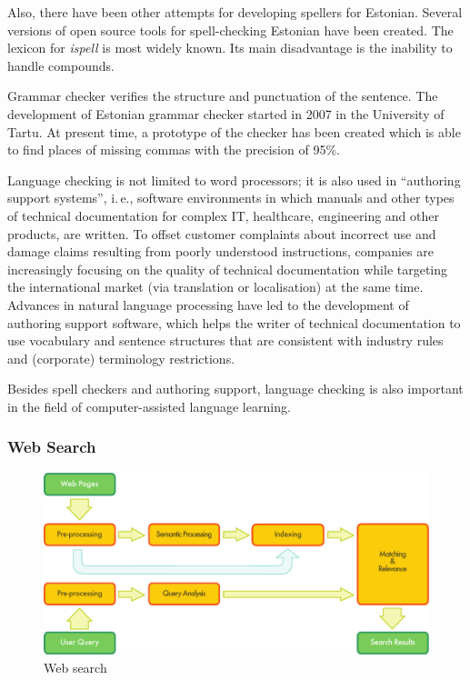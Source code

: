 \begin{multicols}{2}
Also, there have been other attempts for developing spellers for Estonian. 
Several versions of open source tools for spell-checking Estonian have been created. 
The lexicon for \textit{ispell} is most widely known. 
Its main disadvantage is the inability to handle compounds. 

Grammar checker verifies the structure and punctuation of the sentence. 
The development of Estonian grammar checker started in 2007 in the University of Tartu. 
At present time, a prototype of the checker has been created which is able to find places of missing commas with the precision of 95\%.

Language checking is not limited to word processors; it is also used
in ``authoring support systems'', i.\,e., software environments in
which manuals and other types of technical documentation for complex
IT, healthcare, engineering and other products, are written. To offset
customer complaints about incorrect use and damage claims resulting
from poorly understood instructions, companies are increasingly
focusing on the quality of technical documentation while targeting the
international market (via translation or localisation) at the same
time. Advances in natural language processing have led to the
development of authoring support software, which helps the writer of
technical documentation to use vocabulary and sentence structures that
are consistent with industry rules and (corporate) terminology
restrictions. 

Besides spell checkers and authoring support, language checking is also important in the field of computer-assisted language learning. 

\subsubsection{Web Search}

\begin{figure}[htb]
  \center
  \includegraphics[width=\textwidth]{../_media/english/web_search_architecture}
  \caption{Web search}
  \label{fig:websearcharch_en}
 \end{figure}


\end{multicols}
